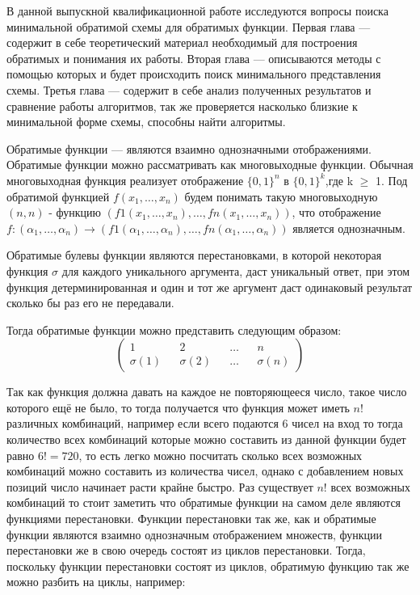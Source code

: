 \documentclass[14pt]{extarticle} %
\begin{document}
В данной выпускной квалификационной работе исследуются вопросы поиска минимальной обратимой схемы для обратимых функции. Первая глава --- содержит в себе теоретический материал необходимый для построения обратимых и понимания их работы. Вторая глава --- описываются методы с помощью которых и будет происходить поиск минимального представления схемы. Третья глава --- содержит в себе анализ полученных результатов и сравнение работы алгоритмов, так же проверяется насколько близкие к минимальной форме схемы, способны найти алгоритмы.


Обратимые функции ---  являются взаимно однозначными отображениями.
Обратимые функции можно рассматривать как многовыходные функции. Обычная многовыходная функция реализует отображение $\{0,1\}^{n}$ в $\{0,1\}^{k}$,где k $\geqslant$ 1. Под обратимой функцией $f(x_{1}, \ldots, x_{n})$ будем понимать такую многовыходную $(n, n)$ - функцию $(f1(x_{1}, \ldots, x_{n}),\ldots, fn(x_{1}, \ldots, x_{n}))$, что отображение
$f : {(\alpha_{1}, \ldots, \alpha_{n})}\rightarrow{(f1(\alpha_{1}, \ldots, \alpha_{n}), \ldots, fn(\alpha_{1}, \ldots, \alpha_{n}))}$
является однозначным.



 Обратимые булевы функции являются перестановками, в которой некоторая функция $\sigma$ для каждого уникального аргумента, даст уникальный ответ, при этом функция детерминированная и один и тот же аргумент даст одинаковый результат сколько бы раз его не передавали.


Тогда обратимые функции можно представить следующим образом: $${\begin{pmatrix}
		1&&2&&\ldots &&n\\
		\sigma (1)&&\sigma (2)&&\ldots &&\sigma (n)
\end{pmatrix}}$$



Так как функция должна давать на каждое не повторяющееся число, такое число которого ещё не было, то тогда получается что функция может иметь $n!$ различных комбинаций, например если всего подаются 6 чисел на вход то тогда количество всех комбинаций которые можно составить из данной функции будет равно $6!=720$, то есть легко можно посчитать сколько всех возможных комбинаций можно составить из количества чисел, однако с добавлением новых позиций число начинает расти крайне быстро.
Раз существует $n!$ всех возможных комбинаций то стоит заметить что обратимые функции на самом деле являются функциями перестановки. Функции перестановки так же, как и обратимые функции являются взаимно однозначным отображением множеств, функции перестановки же в свою очередь состоят из циклов перестановки.
Тогда, поскольку функции перестановки состоят из циклов, обратимую функцию так же можно разбить на циклы, например:
\end{document}
